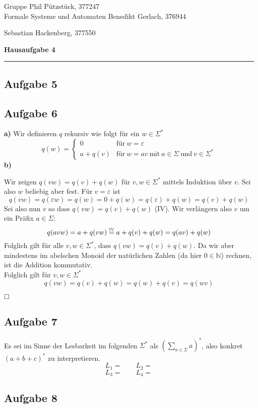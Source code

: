 \documentclass[a4paper,graphics,11pt]{article}
\newcommand{\aufgabe}[1]{\subsection*{Aufgabe #1}}
\newcommand{\up}[2]{\mathrel{\overset{\makebox[0pt]{\mbox{\normalfont\tiny #2}}}{#1}}}
\begin{document}
\noindent Gruppe              \hfill Phil Pützstück, 377247\\
\noindent Formale Systeme und Automaten \hfill Benedikt Gerlach, 376944\\
\strut\hfill Sebastian Hackenberg, 377550\\
\begin{center}
	\LARGE{\textbf{Hausaufgabe 4}}
\end{center}
\begin{center}
\rule[0.1ex]{\textwidth}{1pt}
\end{center}

\aufgabe{5}
\newpage
\aufgabe{6}
\textbf{a)}
Wir definieren $q$ rekursiv wie folgt für ein $w \in \Sigma^*$
$$
    q(w) = \begin{cases}
        0 & \text{für}\ w = \varepsilon\\
        a + q(v) & \text{für}\ w = av\ \text{mit}\ a \in \Sigma\ \text{und}\ v \in \Sigma^*
    \end{cases}
$$
\textbf{b)}

Wir zeigen $q(vw) = q(v) + q(w)$ für $v,w \in \Sigma^*$ mittels Induktion über $v$. Sei also $w$ beliebig aber fest.
Für $v = \varepsilon$ ist
$$
    q(vw)
    = q(\varepsilon w)
    = q(w)
    = 0 + q(w)
    = q(\varepsilon) + q(w)
    = q(v) + q(w)
$$
Sei also nun $v$ so dass $q(vw) = q(v) + q(w)$ (IV). Wir verlängern also $v$ um ein Präfix $a \in \Sigma$:
$$
    q(avw)
    = a + q(vw)
    \up{=}{IV} a + q(v) + q(w)
    = q(av) + q(w)
$$
Folglich gilt für alle $v,w \in \Sigma^*$, dass $q(vw) = q(v) + q(w)$. Da wir aber mindestens im abelschen
Monoid der natürlichen Zahlen (da hier $0 \in \mathbb{N}$) rechnen, ist die Addition kommutativ.\\
Folglich gilt für $v,w \in \Sigma^*$
$$
    q(vw)
    = q(v) + q(w)
    = q(w) + q(v)
    = q(wv)
$$
\strut$\hfill\square$

\aufgabe{7}
Es sei im Sinne der Lesbarkeit im folgenden $\Sigma^*$ als $(\sum_{a \in \Sigma} a)^*$, also konkret $(a+b+c)^*$ zu interpretieren.
$$
    L_1 =
    \qquad
    L_2 =
$$$$
    L_3 =
    \qquad
    L_4 =
$$
\newpage
\aufgabe{8}
\end{document}
